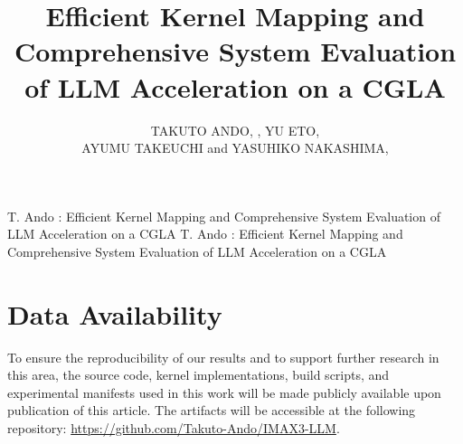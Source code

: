 \documentclass{ieeeaccess}
\newcommand\orcidicon[1]{\raisebox{0.4ex}{\usebox{\ORCIDlogo}}}
\begin{document}
\title{Efficient Kernel Mapping and Comprehensive System Evaluation of LLM Acceleration on a CGLA}

\author{\uppercase{Takuto ANDO}\href{https://orcid.org/0009-0005-1873-869X}{\orcidicon{0009-0005-1873-869X}}, ,
\uppercase{Yu ETO}\href{https://orcid.org/0009-0006-0640-1683}{\orcidicon{0009-0006-0640-1683}},\\ \uppercase{Ayumu TAKEUCHI}\href{https://orcid.org/0009-0006-2094-3163}{\orcidicon{0009-0006-2094-3163}} and \uppercase{Yasuhiko NAKASHIMA}\href{https://orcid.org/0000-0002-9457-5061}{\orcidicon{0000-0002-9457-5061}}, }


\address{Nara Institute of Science and Technology (NAIST), Ikoma, Nara 630-0192, Japan}


\markboth
{T. Ando \headeretal: Efficient Kernel Mapping and Comprehensive System Evaluation of LLM Acceleration on a CGLA}
{T. Ando \headeretal: Efficient Kernel Mapping and Comprehensive System Evaluation of LLM Acceleration on a CGLA}








\titlepgskip=-15pt

\maketitle










\section*{Data Availability}
To ensure the reproducibility of our results and to support further research in this area, the source code, kernel implementations, build scripts, and experimental manifests used in this work will be made publicly available upon publication of this article.
The artifacts will be accessible at the following repository: \url{https://github.com/Takuto-Ando/IMAX3-LLM}.
\end{document}
